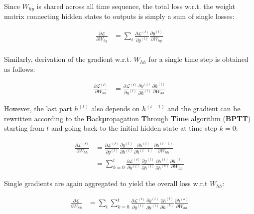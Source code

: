 \documentclass[]{krantz}
\begin{document}
Since \(W_{hy}\) is shared across all time sequence, the total loss w.r.t. the weight matrix connecting hidden states to outputs is simply a sum of single losses:

\begin{align}
\frac{\partial \mathcal{L}}{\partial W_{hy}} & = \sum_{t} \frac{\partial \mathcal{L^{(t)}}}{\partial y^{(t)}} \frac{\partial y^{(t)}} {\partial W_{hy}}  \label{eq:rnn-back-hy-all} \\
\end{align}

Similarly, derivation of the gradient w.r.t. \(W_{hh}\) for a single time step is obtained as follows:

\begin{align}
\frac{\partial \mathcal{L^{(t)}}}{\partial W_{hh}} & = \frac{\partial \mathcal{L^{(t)}}}{\partial y^{(t)}} \frac{\partial y^{(t)}}{\partial h^{(t)}} \frac{\partial h^{(t)}}{\partial W_{hh}} \label{eq:rnn-back-hh-one}
\end{align}

However, the last part \(h^{(t)}\) also depends on \(h^{(t-1)}\) and the gradient can be rewritten according to the \textbf{B}ack\textbf{p}ropagation \textbf{T}hrough \textbf{Time} algorithm (\textbf{BPTT}) starting from \(t\) and going back to the initial hidden state at time step \(k=0\):

\begin{align}
\frac{\partial \mathcal{L^{(t)}}}{\partial W_{hh}}
& = \frac{\partial \mathcal{L^{(t)}}}{\partial y^{(t)}} \frac{\partial y^{(t)}}{\partial h^{(t)}} \frac{\partial h^{(t)}}{\partial h^{(t-1)}} \frac{\partial h^{(t-1)}}{\partial W_{hh}} \\
& = \sum_{k=0}^{t} \frac{\partial \mathcal{L^{(t)}}}{\partial y^{(t)}} \frac{\partial y^{(t)}}{\partial h^{(t)}} \frac{\partial h^{(t)}}{\partial h^{(k)}} \frac{\partial h^{(k)}}{\partial W_{hh}} \label{eq:rnn-back-hh-one-one}
\end{align}

Single gradients are again aggregated to yield the overall loss w.r.t \(W_{hh}\):

\begin{align}
\frac{\partial \mathcal{L}}{\partial W_{hh}}
& = \sum_{t} \sum_{k=0}^{t} \frac{\partial \mathcal{L^{(t)}}}{\partial y^{(t)}} \frac{\partial y^{(t)}}{\partial h^{(t)}} \frac{\partial h^{(t)}}{\partial h^{(k)}} \frac{\partial h^{(k)}}{\partial W_{hh}} \label{eq:rnn-back-hh-all}
\end{align}
\end{document}
